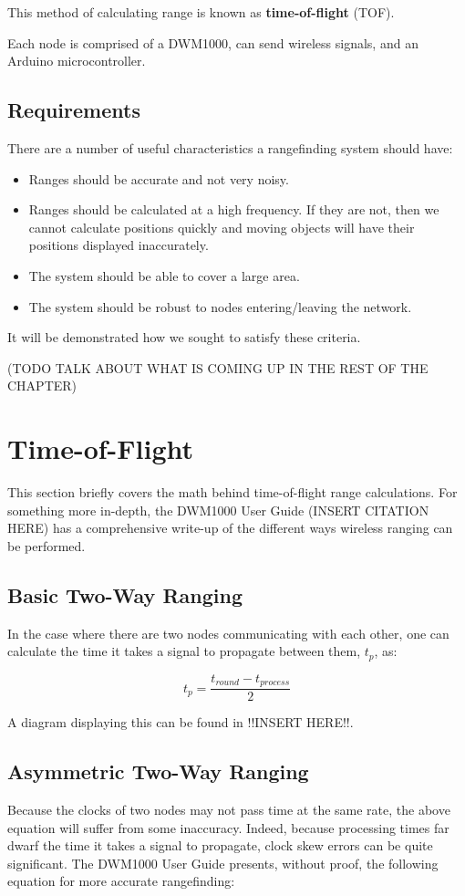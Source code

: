 This method of calculating range is known as \textbf{time-of-flight} (TOF).

Each node is comprised of a DWM1000, can send wireless signals, and an Arduino microcontroller.

\subsection{Requirements}
There are a number of useful characteristics a rangefinding system should have:
\begin{itemize}
	\item Ranges should be accurate and not very noisy.
	\item Ranges should be calculated at a high frequency. If they are not, then we cannot calculate positions quickly and moving objects will have their positions displayed inaccurately.
	\item The system should be able to cover a large area. 
	\item The system should be robust to nodes entering/leaving the network. 
\end{itemize}

It will be demonstrated how we sought to satisfy these criteria.

(TODO TALK ABOUT WHAT IS COMING UP IN THE REST OF THE CHAPTER)

\section{Time-of-Flight}
This section briefly covers the math behind time-of-flight range calculations. For something more in-depth, the DWM1000 User Guide (INSERT CITATION HERE) has a comprehensive write-up of the different ways wireless ranging can be performed.

\subsection{Basic Two-Way Ranging}
In the case where there are two nodes communicating with each other, one can calculate the time it takes a signal to propagate between them, $t_p$, as:

\[
	t_p = \frac{t_{round} - t_{process}}{2}
\]

A diagram displaying this can be found in !!INSERT HERE!!.

\subsection{Asymmetric Two-Way Ranging}
Because the clocks of two nodes may not pass time at the same rate, the above equation will suffer from some inaccuracy. Indeed, because processing times far dwarf the time it takes a signal to propagate, clock skew errors can be quite significant. The DWM1000 User Guide presents, without proof, the following equation for more accurate rangefinding:

